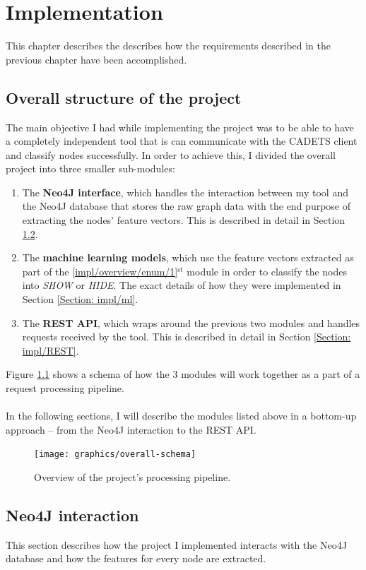 
	\chapter{Implementation}
	This chapter describes the describes how the requirements described in the previous chapter have been accomplished. 
	\section{Overall structure of the project} \label{Section: impl/overview}
	The main objective I had while implementing the project was to be able to have a completely independent tool that is can communicate with the CADETS client and classify nodes successfully. In order to achieve this, I divided the overall project into three smaller sub-modules:
	
	\begin{enumerate}
		\item \label{impl/overview/enum/1} The \textbf{Neo4J interface}, which handles the interaction between my tool and the Neo4J database that stores the raw graph data with the end purpose of extracting the nodes' feature vectors. This is described in detail in Section \ref{Section: impl/neo4j}.
		\item The \textbf{machine learning models}, which use the feature vectors extracted as part of the \ref{impl/overview/enum/1}$^{\text{st}}$ module in order to classify the nodes into \textit{SHOW} or \textit{HIDE}. The exact details of how they were implemented in Section \ref{Section: impl/ml}.
		\item The \textbf{REST API}, which wraps around the previous two modules and handles requests received by the tool. This is described in detail in Section \ref{Section: impl/REST}.
	\end{enumerate}
	Figure \ref{Fig: impl/pipeline} shows a schema of how the 3 modules will work together as a part of a request processing pipeline. 
	\\ \\
	In the following sections, I will describe the modules listed above in a bottom-up approach -- from the Neo4J interaction to the REST API. 
	\begin{figure}[H]
		\centering
		\texttt{[image: graphics/overall-schema]}	
		\caption[Processing pipeline]{Overview of the project's processing pipeline.}
		\label{Fig: impl/pipeline}
	\end{figure}
	\section{Neo4J interaction} \label{Section: impl/neo4j}
	This section describes how the project I implemented interacts with the Neo4J database and how the features for every node are extracted. 
